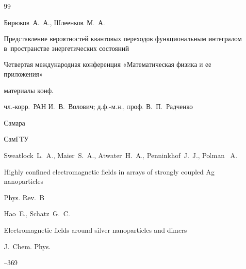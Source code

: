 \RusRef



\begin{thebibliography}{99}






\by  Бирюков~А.~А., Шлеенков~М.~А.

\paper Представление вероятностей квантовых переходов функциональным интегралом в~пространстве энергетических состояний


\inbook Четвертая международная конференция «Математическая физика и ее приложения»

\bookinfo материалы конф. 

\eds чл.-корр.~РАН И.~В.~Волович; д.ф.-м.н., проф. В.~П.~Радченко

\publaddr Самара

\publ СамГТУ







\by Sweatlock~L.~A., Maier~S.~A., Atwater~H.~A., Penninkhof~J.~J., Polman~ A. 

\paper Highly confined electromagnetic fields in arrays of strongly coupled Ag nanoparticles 

\jour Phys. Rev.~B











\by Hao~E., Schatz~G.~C.

\paper Electromagnetic fields around silver nanoparticles and dimers 

\jour J.~Chem. Phys.




--369







\end{thebibliography}
